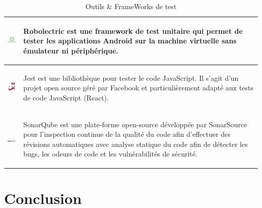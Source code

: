 \begin{table}[H]
\begin{center}
\begin{tabularx}{\textwidth}{ |p{3.5cm}|X| }
\begin{center}
\includegraphics[width=2cm]{Figures/robolectric.png} 
\end{center}
& 
\begin{center}
Robolectric est une framework de test unitaire qui permet de tester les applications Android sur la machine virtuelle sans \'emulateur ni p\'eriph\'erique.
\end{center}
\\ \hline

\begin{center}
\includegraphics[width=2cm]{Figures/jest.png} 
\end{center}
& 
\begin{center}
Jest est une biblioth\`eque pour tester le code JavaScript. Il s'agit d'un projet open source g\'er\'e par Facebook et particuli\`erement adapt\'e aux tests de code JavaScript (React).
\end{center}
\\ \hline

\begin{center}
\includegraphics[width=2cm]{Figures/sonar.png} 
\end{center}
& 
\begin{center}
SonarQube est une plate-forme open-source d\'evelopp\'ee par SonarSource pour l'inspection continue de la qualit\'e du code afin d'effectuer des r\'evisions automatiques avec analyse statique du code afin de d\'etecter les bugs, les odeurs de code et les vuln\'erabilit\'es de s\'ecurit\'e.
\end{center}
\\ \hline


\end{tabularx}
\caption{Outils \& FrameWorks de test}
\end{center}
\end{table}

\section{Conclusion}





